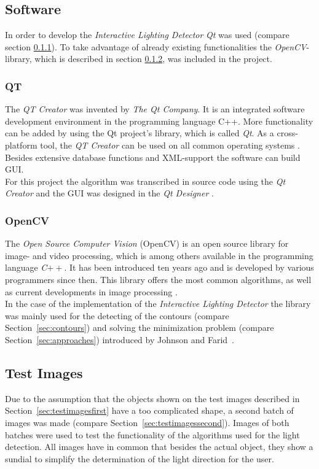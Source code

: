 \subsection{Software} \label{sec:Software}

In order to develop the \textit{Interactive Lighting Detector} \textit{Qt} was used (compare section \ref{sec:qt}). To take advantage of already existing functionalities the \textit{OpenCV}-library, which is described in section \ref{sec:opencv}, was included in the project.


\subsubsection{QT} \label{sec:qt}

The \textit{QT Creator} was invented by \textit{The Qt Company}. It is an integrated software development environment in the programming language C++. More functionality can be added by using the Qt project's library, which is called \textit{Qt}.
As a cross-platform tool, the \textit{QT Creator} can be used on all common operating systems \cite{QTCreator}. \\ Besides extensive database functions and XML-support the software can build GUI.\\
For this project the algorithm was transcribed in source code using the \textit{Qt Creator} and the GUI was designed in the \textit{Qt Designer} \cite{website:QtDesigner}.




\subsubsection{OpenCV} \label{sec:opencv}
The \textit{Open Source Computer Vision} (OpenCV) is an open source library for image- and video processing, which is among others available in the programming language \textit{C}$++$. It has been introduced ten years ago and is developed by various programmers since then. This library offers the most common algorithms, as well as current developments in image processing \cite{article:OpenCV}.\\
In the case of the implementation of the \textit{Interactive Lighting Detector} the library was mainly used for the detecting of the contours (compare Section~\ref{sec:contours}) and solving the minimization problem (compare Section~\ref{sec:approaches}) introduced by Johnson and Farid~\cite{Johnson}.


\subsection{Test Images} \label{sec:testimages}
Due to the assumption that the objects shown on the test images described in Section~\ref{sec:testimagesfirst} have a too complicated shape, a second batch of images was made (compare Section~\ref{sec:testimagessecond}). Images of both batches were used to test the functionality of the algorithms used for the light detection. All images have in common that besides the actual object, they show a sundial to simplify the determination of the light direction for the user.


